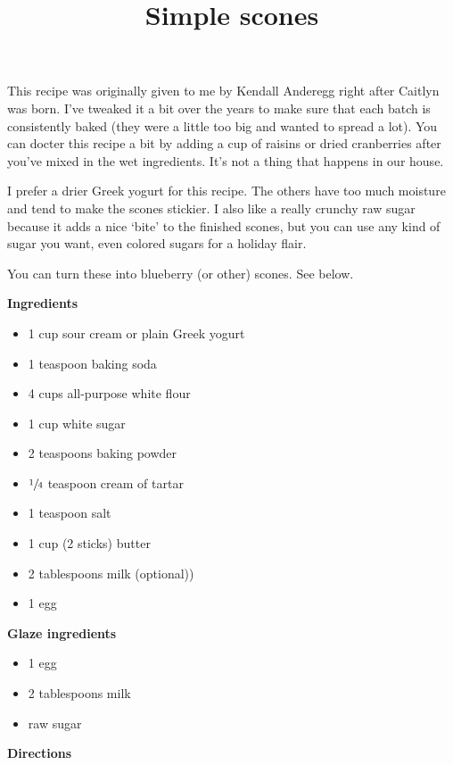 \documentclass{article}
\title{Simple scones}
\begin{document}
This recipe was originally given to me by Kendall Anderegg right after Caitlyn was
born. I've tweaked it a bit over the years to make sure that each batch is consistently
baked (they were a little too big and wanted to spread a lot). You can docter this
recipe a bit by adding a cup of raisins or dried cranberries after you've mixed in
the wet ingredients. It's not a thing that happens in our house.

I prefer a drier Greek yogurt for this recipe. The others have too much moisture and
tend to make the scones stickier. I also like a really crunchy raw sugar because it
adds a nice `bite' to the finished scones, but you can use any kind of sugar you want,
even colored sugars for a holiday flair.

You can turn these into blueberry (or other) scones. See below.

\bigskip

\begin{multicols}{2}
    \textbf{Ingredients}

    \begin{itemize}
        \item 1 cup sour cream or plain Greek yogurt
        \item 1 teaspoon baking soda
        \item 4 cups all-purpose white flour
        \item 1 cup white sugar
        \item 2 teaspoons baking powder
        \item $\sfrac{1}{4}$ teaspoon cream of tartar
        \item 1 teaspoon salt
        \item 1 cup (2 sticks) butter
        \item 2 tablespoons milk (optional))
        \item 1 egg
    \end{itemize}

    \columnbreak

    \textbf{Glaze ingredients}
    \begin{itemize}
        \item 1 egg
        \item 2 tablespoons milk
        \item raw sugar
    \end{itemize}

\end{multicols}


\textbf{Directions}
\end{document}
